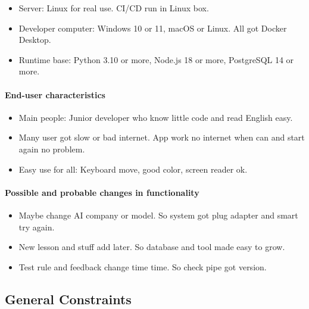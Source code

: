 \documentclass{FastFyp}
\begin{document}
\begin{itemize}
  \item Server: Linux for real use. CI/CD run in Linux box.
  \item Developer computer: Windows 10 or 11, macOS or Linux. All got Docker Desktop.
  \item Runtime base: Python 3.10 or more, Node.js 18 or more, PostgreSQL 14 or more.
\end{itemize}

\paragraph{End-user characteristics}

\begin{itemize}
  \item Main people: Junior developer who know little code and read English easy.
  \item Many user got slow or bad internet. App work no internet when can and start again no problem.
  \item Easy use for all: Keyboard move, good color, screen reader ok.
\end{itemize}

\paragraph{Possible and probable changes in functionality}

\begin{itemize}
  \item Maybe change AI company or model. So system got plug adapter and smart try again.
  \item New lesson and stuff add later. So database and tool made easy to grow.
  \item Test rule and feedback change time time. So check pipe got version.
\end{itemize}
\subsection{General Constraints}
\end{document}
